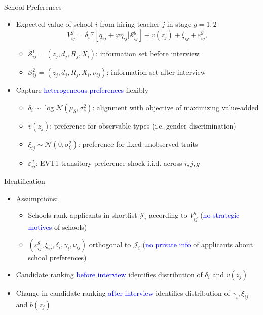 \documentclass[compress,10pt,aspectratio=169]{beamer}
\newcommand\emphblue[1]{\textcolor{blue}{#1}}
\begin{document}
\begin{frame}{School Preferences}
    \begin{itemize}
        \item Expected value of school $i$ from hiring teacher $j$ in stage $g=1,2$
$$
V_{ij}^g= \delta_i\mathbb{E}[q_{ij}+\varphi\eta_{ij}|\mathcal{S}^g_{ij}]+v(z_j)+\xi_{ij}+\varepsilon^g_{ij},
$$
\begin{itemize}
    \item[$\Rightarrow$] $\mathcal{S}^1_{ij}=(z_j,d_j,R_j, X_i)$: information set before interview
    \medskip
    \item[$\Rightarrow$] $\mathcal{S}^2_{ij}=(z_j,d_j,R_j, X_i,\nu_{ij})$: information set after interview
    \bigskip
    \end{itemize}
    \item Capture \emphblue{heterogeneous preferences} flexibly
    \begin{itemize}
    \smallskip
    \item[$\Rightarrow$] $\delta_i \sim \log \mathcal{N}(\mu_{\delta},\sigma_{\delta}^2)$: alignment with objective of maximizing value-added
    \medskip
    \item[$\Rightarrow$] $v(z_j)$: preference for observable types (i.e. gender discrimination)
    \medskip
    \item[$\Rightarrow$] $\xi_{ij}\sim \mathcal{N}(0,\sigma_{\xi}^2)$: preference for fixed unobserved traits
    \medskip
    \item[$\Rightarrow$] $\varepsilon^g_{ij}$: EVT1 transitory preference shock i.i.d. across $i,j,g$
\end{itemize}
    \end{itemize}
\end{frame}


\begin{frame}{Identification}
    \begin{itemize}
        \item Assumptions:
        \begin{itemize}
        \smallskip
        \item[$\Rightarrow$] Schools rank applicants in shortlist $\mathcal{J}_i$ according to $V_{ij}^g$ (\emphblue{no strategic motives} of schools)\medskip
            \item[$\Rightarrow$] $(\varepsilon^g_{ij},\xi_{ij},\delta_i,\gamma_i,\nu_{ij})$ orthogonal to $\mathcal{J}_i$ (\emphblue{no private info} of applicants about school preferences)
        \end{itemize}
        \bigskip
        \item Candidate ranking \emphblue{before interview} identifies distribution of $\delta_i$ and $v(z_j)$
            \bigskip
        \item Change in candidate ranking \emphblue{after interview} identifies distribution of $\gamma_i,\xi_{ij}$ and $b(z_j)$
    \end{itemize}
\end{frame}
\end{document}
